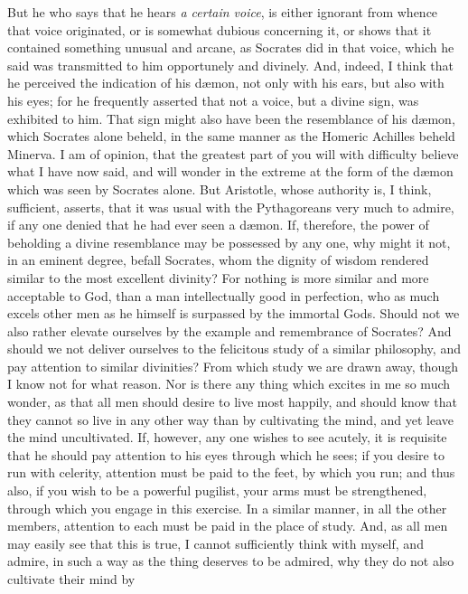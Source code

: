 \documentclass[12pt]{article}
\begin{document}
\noindent But he who says that he hears \textit{a certain voice}, is either
ignorant from whence that voice originated, or is somewhat dubious concerning
it, or shows that it contained something unusual and arcane, as Socrates did in
that voice, which he said was transmitted to him opportunely and divinely. And,
indeed, I think that he perceived the indication of his d{\ae}mon, not only
with his ears, but also with his eyes; for he frequently asserted that not a
voice, but a divine sign, was exhibited to him.  That sign might also have been
the resemblance of his d{\ae}mon, which Socrates alone beheld, in the same
manner as the Homeric Achilles beheld Minerva. I am of opinion, that the
greatest part of you will with difficulty believe what I have now said, and
will wonder in the extreme at the form of the d{\ae}mon which was seen by
Socrates alone.  But Aristotle, whose authority is, I think, sufficient,
asserts, that it was usual with the Pythagoreans very much to admire, if any
one denied that he had ever seen a d{\ae}mon. If, therefore, the power of
beholding a divine resemblance may be possessed by any one, why might it not,
in an eminent degree, befall Socrates, whom the dignity of wisdom rendered
similar to the most excellent divinity? For nothing is more similar and more
acceptable to God, than a man intellectually good in perfection, who as much
excels other men as he himself is surpassed by the immortal Gods. Should not we
also rather elevate ourselves by the example and remembrance of Socrates?  And
should we not deliver ourselves to the felicitous study of a similar
philosophy, and pay attention to similar divinities? From which study we are
drawn away, though I know not for what reason. Nor is there any thing which
excites in me so much wonder, as that all men should desire to live most
happily, and should know that they cannot so live in any other way than by
cultivating the mind, and yet leave the mind uncultivated. If, however, any one
wishes to see acutely, it is requisite that he should pay attention to his eyes
through which he sees; if you desire to run with celerity, attention must be
paid to the feet, by which you run; and thus also, if you wish to be a powerful
pugilist, your arms must be strengthened, through which you engage in this
exercise. In a similar manner, in all the other members, attention to each must
be paid in the place of study. And, as all men may easily see that this is
true, I cannot sufficiently think with myself, and admire, in such a way as the
thing deserves to be admired, why they do not also cultivate their mind by
\end{document}
